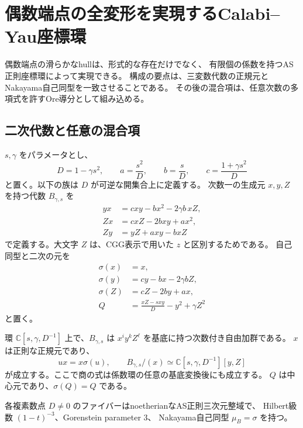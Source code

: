 \section{偶数端点の全変形を実現するCalabi--Yau座標環}
\label{sec:endpoint-quantization-v37}

偶数端点の滑らかなhullは、形式的な存在だけでなく、
有限個の係数を持つAS正則座標環によって実現できる。
構成の要点は、三変数代数の正規元とNakayama自己同型を一致させることである。
その後の混合項は、任意次数の多項式を許すOre導分として組み込める。

\subsection{二次代数と任意の混合項}

$s,\gamma$ をパラメータとし、
\[
 D=1-\gamma s^2,\qquad
 a=\frac{s^2}{D},\qquad b=\frac{s}{D},\qquad
 c=\frac{1+\gamma s^2}{D}
\]
と置く。以下の族は $D$ が可逆な開集合上に定義する。
次数一の生成元 $x,y,Z$ を持つ代数 $B_{\gamma,s}$ を
\begin{equation}
\label{eq:endpoint-B-relations-v37}
\begin{aligned}
 yx&=cxy-bx^2-2\gamma b\,xZ,\\
 Zx&=cxZ-2bxy+ax^2,\\
 Zy&=yZ+axy-bxZ
\end{aligned}
\end{equation}
で定義する。大文字 $Z$ は、CGG表示で用いた $z$ と区別するためである。
自己同型と二次の元を
\begin{equation}
\label{eq:endpoint-sigma-Q-v37}
\begin{aligned}
 \sigma(x)&=x,\\
 \sigma(y)&=cy-bx-2\gamma bZ,\\
 \sigma(Z)&=cZ-2by+ax,\\
 Q&=\frac{xZ-sxy}{D}-y^2+\gamma Z^2
\end{aligned}
\end{equation}
と置く。

\begin{proposition}[三変数部分の構造]
\label{prop:endpoint-base-v37}
環 $\mathbb C[s,\gamma,D^{-1}]$ 上で、$B_{\gamma,s}$ は
$x^i y^k Z^\ell$ を基底に持つ次数付き自由加群である。
$x$ は正則な正規元であり、
\[
 ux=x\sigma(u),\qquad
 B_{\gamma,s}/(x)\simeq\mathbb C[s,\gamma,D^{-1}][y,Z]
\]
が成立する。ここで商の式は係数環の任意の基底変換後にも成立する。
$Q$ は中心元であり、$\sigma(Q)=Q$ である。

各複素数点 $D\ne0$ のファイバーはnoetherianなAS正則三次元整域で、
Hilbert級数 $(1-t)^{-3}$、Gorenstein parameter $3$、
Nakayama自己同型 $\mu_B=\sigma$ を持つ。
\end{proposition}

